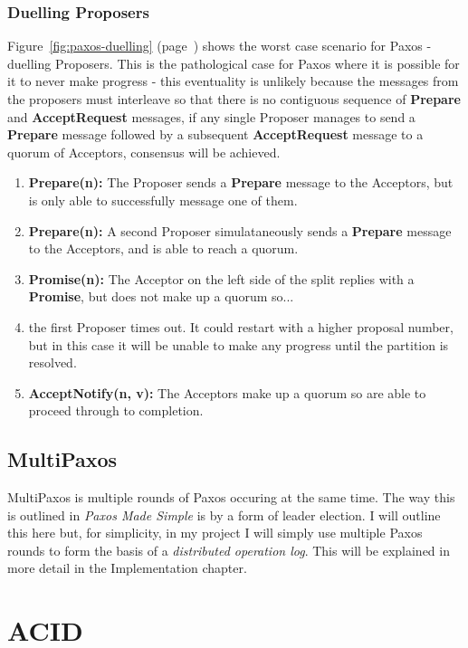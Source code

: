 \documentclass[12pt,twoside,notitlepage]{report}
\newcommand{\msg}[1] {{\bf #1}}         %
\begin{document}
\subsubsection*{Duelling Proposers}

Figure~\ref{fig:paxos-duelling} (page~\pageref{fig:paxos-duelling}) shows the worst case scenario
for Paxos - duelling Proposers. This is the pathological case for Paxos where it is possible for
it to never make progress - this eventuality is unlikely because the messages from the proposers
must interleave so that there is no contiguous sequence of \msg{Prepare} and \msg{AcceptRequest}
messages, if any single Proposer manages to send a \msg{Prepare} message followed by a
subsequent \msg{AcceptRequest} message to a quorum of Acceptors, consensus will be achieved.

\begin{enumerate}
\item \msg{Prepare(n):} The Proposer sends a \msg{Prepare} message to the Acceptors, but is only
	able to successfully message one of them.
\item \msg{Prepare(n):} A second Proposer simulataneously sends a \msg{Prepare} message to the
	Acceptors, and is able to reach a quorum.
\item \msg{Promise(n):} The Acceptor on the left side of the split replies with a \msg{Promise},
	but does not make up a quorum so...
\item the first Proposer times out. It could restart with a higher proposal number, but in this
	case it will be unable to make any progress until the partition is resolved.
\item \msg{AcceptNotify(n, v):} The Acceptors make up a quorum so are able to proceed through to
	completion.
\end{enumerate}

\subsection{MultiPaxos}

MultiPaxos is multiple rounds of Paxos occuring at the same time. The way this is outlined in
\emph{Paxos Made Simple} \cite{lamport01} is by a form of leader election. I will outline this
here but, for simplicity, in my project I will simply use multiple Paxos rounds to form the basis
of a \emph{distributed operation log}. This will be explained in more detail in the Implementation
chapter.

\section{ACID}
\end{document}
